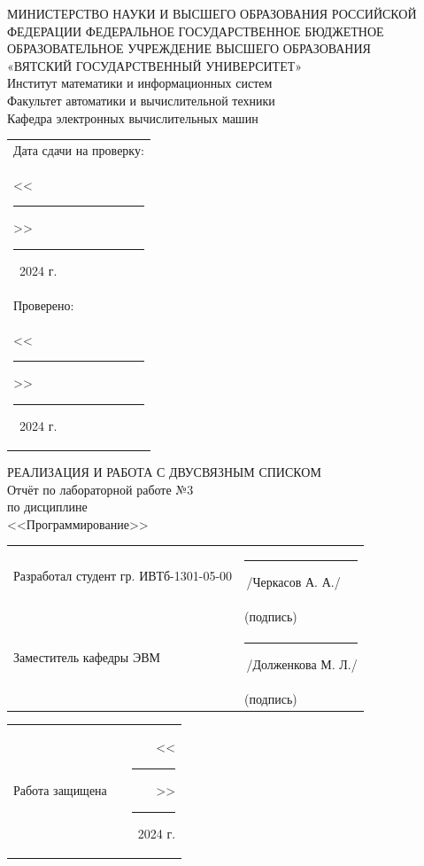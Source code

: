 \documentclass[oneside,a4paper,14pt]{extarticle}
\begin{document}
\newpage
\thispagestyle{empty}
\begin{center}
	МИНИСТЕРСТВО НАУКИ И ВЫСШЕГО ОБРАЗОВАНИЯ РОССИЙСКОЙ ФЕДЕРАЦИИ ФЕДЕРАЛЬНОЕ ГОСУДАРСТВЕННОЕ БЮДЖЕТНОЕ ОБРАЗОВАТЕЛЬНОЕ УЧРЕЖДЕНИЕ ВЫСШЕГО ОБРАЗОВАНИЯ\\
	«ВЯТСКИЙ ГОСУДАРСТВЕННЫЙ УНИВЕРСИТЕТ»\\
	Институт математики и информационных систем\\
	Факультет автоматики и вычислительной техники\\
	Кафедра электронных вычислительных машин
\end{center}
\vspace{10mm}

\hfill
\begin{tabular}{l}
  \footnotesize Дата сдачи на проверку: \\
  \footnotesize <<\rule[-1mm]{5mm}{0.10mm}\/>>\rule[-1mm]{20mm}{0.10mm}\ 2024 г.\\
  \footnotesize Проверено: \\
  \footnotesize <<\rule[-1mm]{5mm}{0.10mm}\/>>\rule[-1mm]{20mm}{0.10mm}\ 2024 г. \\
\end{tabular}
\vfill

\begin{center}
    РЕАЛИЗАЦИЯ И РАБОТА С ДВУСВЯЗНЫМ СПИСКОМ\\
	Отчёт по лабораторной работе №3\\
	по дисциплине\\
	<<Программирование>>\\
\end{center}
\vspace{30mm}
\noindent
\begin{tabular}{ll}
	Разработал студент гр. ИВТб-1301-05-00 & \rule[-1mm]{30mm}{0.10mm}\,/Черкасов А. А./   \\
	                                       & \hspace{8mm}\footnotesize(подпись)            \\
	Заместитель кафедры ЭВМ                & \rule[-1mm]{30mm}{0.10mm}\,/Долженкова М. Л./ \\
	                                       & \hspace{8mm}\footnotesize(подпись)            \\
\end{tabular}

\noindent
  \begin{tabular}{lp{58mm}r}
    Работа защищена &  & <<\rule[-1mm]{5mm}{0.10mm}\/>>\rule[-1mm]{30mm}{0.10mm}\ 2024 г.
  \end{tabular}
  \vfill
\end{document}
